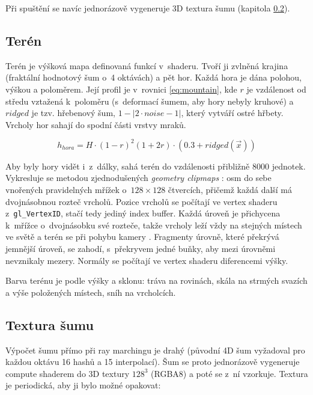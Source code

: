 \documentclass[a4paper, 12pt]{article}
\begin{document}
Při spuštění se navíc jednorázově vygeneruje 3D textura šumu
(kapitola \ref{sec:noise-texture}).

\subsection{Terén}

Terén je výšková mapa definovaná funkcí v~shaderu. Tvoří ji zvlněná krajina
(fraktální hodnotový šum o~4 oktávách) a pět hor. Každá hora je dána
polohou, výškou a poloměrem. Její profil je v~rovnici \ref{eq:mountain},
kde $r$ je vzdálenost od středu vztažená k~poloměru (s~deformací šumem, aby hory
nebyly kruhové) a $ridged$ je tzv. hřebenový šum, $1 - |2 \cdot noise - 1|$,
který vytváří ostré hřbety. Vrcholy hor sahají do spodní části vrstvy mraků.

\begin{equation}
  h_{hora} = H \cdot (1 - r)^2 (1 + 2r) \cdot (0.3 + ridged(\vec{x}))
  \label{eq:mountain}
\end{equation}

Aby byly hory vidět i~z~dálky, sahá terén do vzdálenosti přibližně 8000
jednotek. Vykresluje se metodou zjednodušených \textit{geometry clipmaps}
\cite{losasso2004}: osm do sebe vnořených pravidelných mřížek o~$128 \times 128$
čtvercích, přičemž každá další má dvojnásobnou rozteč vrcholů. Pozice vrcholů
se počítají ve vertex shaderu z~\texttt{gl\_VertexID}, stačí tedy jediný
index buffer. Každá úroveň je přichycena k~mřížce o~dvojnásobku své rozteče,
takže vrcholy leží vždy na stejných místech ve světě a terén se při pohybu
kamery . Fragmenty úrovně, které překrývá jemnější úroveň, se zahodí,
s~překryvem jedné buňky, aby mezi úrovněmi nevznikaly mezery.
Normály se počítají ve vertex shaderu diferencemi výšky.

Barva terénu je podle výšky a sklonu: tráva na rovinách, skála na strmých
svazích a výše položených místech, sníh na vrcholcích.

\subsection{Textura šumu} \label{sec:noise-texture}

Výpočet šumu přímo při ray marchingu je drahý (původní 4D šum vyžadoval
pro každou oktávu 16 hashů a 15 interpolací). Šum se proto jednorázově
vygeneruje compute shaderem do 3D textury $128^3$ (RGBA8) a poté se z~ní
vzorkuje. Textura je periodická, aby ji bylo možné opakovat:
\end{document}
